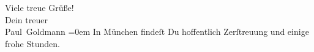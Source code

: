 \pstart
           Viele treue Grüße! {\\[\baselineskip]}Dein treuer {\\[\baselineskip]}\spacefill\mbox{Paul Goldmann}\pend
           \leftskip=0em{}
\pstart
           \noindent{}In München findeſt Du hoffentlich
                  Zerſtreuung und einige frohe Stunden.\pend
           \endnumbering{}  \newcommand{\dateiname}{L02886}\newcommand{\titel}{Paul Goldmann an Arthur Schnitzler, 12. 9. [1899]}\newcommand{\editorInnen}{Martin Anton Müller und Laura Untner}
